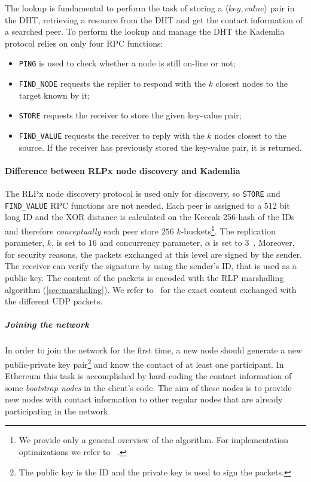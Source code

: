 The lookup is fundamental to perform the task of storing a $\langle key,
value\rangle$ pair in the DHT, retrieving a resource from the DHT and get
the contact information of a searched peer.
To perform the lookup and manage the DHT the Kademlia protocol relies on only
four RPC functions:
\begin{itemize}
    \item \verb|PING| is used to check whether a node is still on-line
    or not;
    \item \verb|FIND_NODE| requests the replier to respond with the $k$ closest
    nodes to the target known by it;
    \item \verb|STORE| requests the receiver to store the given
    key-value pair;
    \item \verb|FIND_VALUE| requests the receiver to reply with the $k$
    nodes closest to the source. If the receiver has previously stored the
    key-value pair, it is returned.
\end{itemize}


\paragraph{Difference between RLPx node discovery and Kademlia}
\label{sec:rlpx-discovery}
The RLPx node discovery protocol is used only for discovery, so
\verb|STORE| and \verb|FIND_VALUE| RPC functions are not
needed.
Each peer is assigned to a $512$ bit long ID and the XOR distance is calculated
on the Keccak-256-hash of the IDs and therefore
\emph{conceptually} each peer store $256$ $k$-buckets\footnote{
    We provide only a general overview of the algorithm. For implementation
    optimizations we refer to ~\cite{bib:kademlia}.}.
The replication parameter, $k$, is set to $16$ and concurrency parameter,
$\alpha$ is set to $3$~\cite{bib:rlpx-discovery-protocol}. Moreover, for
security reasons, the packets exchanged at this level are signed by the sender.
The receiver can verify the signature by using the sender's ID, that is used as
a public key. The content of the packets is encoded with the RLP marshalling
algorithm (\autoref{sec:marshaling}). We refer
to~\cite{bib:rlpx-discovery-protocol} for the exact content exchanged with the 
different UDP packets.





\subparagraph{Joining the network}
In order to join the network for the first time, a new node should generate a
new public-private key pair\footnote{The public key is the ID and the private
key is used to sign the packets.} and know the contact of at least one
participant. In Ethereum this task is accomplished by hard-coding the contact
information of some \textit{bootstrap nodes} in the client's code. The aim of
these nodes is to provide new nodes with contact information to other regular
nodes that are already participating in the network.

